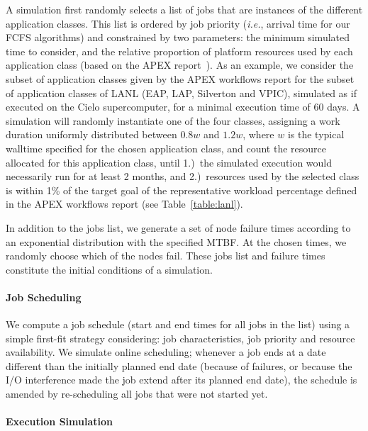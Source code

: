 \documentclass[conference,nofonttune]{IEEEtran}
\newcommand{\ie}[0]{\emph{i.e.}\xspace}
\begin{document}
A simulation first randomly selects a list of jobs that are instances
of the different application classes. This list is ordered by job
priority (\ie, arrival time for our FCFS algorithms) and constrained
by two parameters: the minimum simulated time to consider, and the
relative proportion of platform resources used by each application
class (based on the APEX report~\cite{apex2016}).  As an example, we
consider the subset of application classes given by the APEX workflows
report for the subset of application classes of LANL (EAP, LAP,
Silverton and VPIC), simulated as if executed on the Cielo
supercomputer, for a minimal execution time of 60 days. A simulation
will randomly instantiate one of the four classes, assigning a work
duration uniformly distributed between $0.8w$ and $1.2w$, where $w$ is
the typical walltime specified for the chosen application class, and
count the resource allocated for this application class, until 1.)~the
simulated execution would necessarily run for at least 2 months, and
2.)~resources used by the selected class is within 1\% of the target
goal of the representative workload percentage defined in the APEX
workflows report (see Table~\ref{table:lanl}).

In addition to the jobs list, we generate a set of node failure times according to an
exponential distribution with the specified MTBF. At the chosen times, we randomly
choose which of the nodes fail.  These jobs list and failure times constitute
the initial conditions of a simulation.

\paragraph*{Job Scheduling}

We compute a job schedule (start and end times for all jobs in the list) using
a simple first-fit strategy considering: job characteristics, job priority and
resource availability.  We simulate online scheduling; whenever a job
ends at a date different than the initially planned end date (because of
failures, or because the I/O interference made the job extend after
its planned end date), the schedule is amended by re-scheduling all
jobs that were not started yet.

\paragraph*{Execution Simulation}
\end{document}
